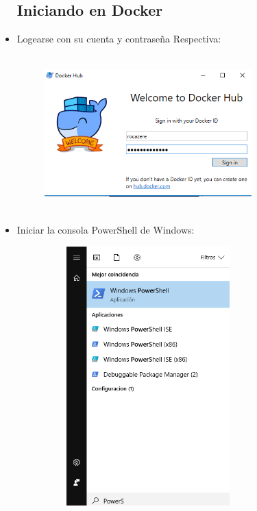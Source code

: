 \begin{itemize}
\subsection{Iniciando en Docker}
	
	\item Logearse con su cuenta y contraseña Respectiva:\\
			
	\begin{figure}[htb]
	\begin{center}
	\includegraphics[width=8cm, height=6cm]{./Imagenes/dockerlogin}
	\end{center}
	\end{figure}
	
	\item Iniciar la consola PowerShell de Windows:\\
	
	\begin{figure}[htb]
	\begin{center}
	\includegraphics[width=8cm, height=10cm]{./Imagenes/powershell}
	\end{center}
	\end{figure}
	\clearpage
	

\end{itemize}
